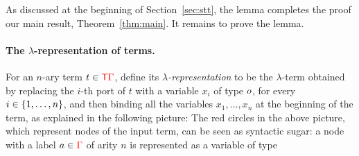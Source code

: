 As discussed at the beginning of  Section~\ref{sec:stt}, the lemma completes the proof  our main result, Theorem~\ref{thm:main}.  
It remains to prove the lemma.

\paragraph*{The $\lambda$-representation of terms.} 
For an $n$-ary term $ t \in {\color{red}{\mathsf T}} {\color{red}{\Gamma}}$, define its \emph{$\lambda$-representation} to be the $\lambda$-term obtained by  replacing the  $i$-th port  of $t$ with a variable $x_i$ of type $o$, for every $i \in \{1,\ldots,n\}$, and then  binding all the  variables $x_1,\ldots,x_n$  at the beginning of the term, as explained in the following picture:
The red circles in the above picture, which represent nodes of the input term, can be seen  as syntactic sugar: a node with a label  $a \in {\color{red}{\Gamma}}$ of arity $n$ is represented  as a variable of type 
